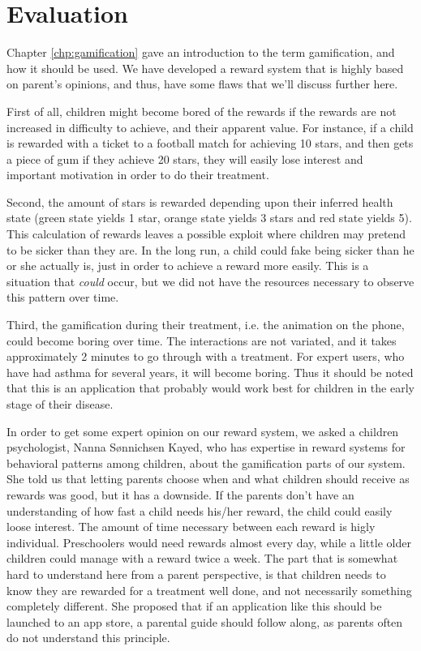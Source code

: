  
\section{Evaluation}
\label{sec:asthmappevaluation}
Chapter \ref{chp:gamification} gave an introduction to the term gamification, and how it should be used. We have developed a reward system that is highly based on parent's opinions, and thus, have some flaws that we'll discuss further here.

First of all, children might become bored of the rewards if the rewards are not increased in difficulty to achieve, and their apparent value. For instance, if a child is rewarded with a ticket to a football match for achieving 10 stars, and then gets a piece of gum if they achieve 20 stars, they will easily lose interest and important motivation in order to do their treatment. 

Second, the amount of stars is rewarded depending upon their inferred health state (green state yields 1 star, orange state yields 3 stars and red state yields 5). This calculation of rewards leaves a possible exploit where children may pretend to be sicker than they are. In the long run, a child could fake being sicker than he or she actually is, just in order to achieve a reward more easily. This is a situation that \emph{could} occur, but we did not have the resources necessary to observe this pattern over time.

Third, the gamification during their treatment, i.e. the animation on the phone, could become boring over time. 
The interactions are not variated, and it takes approximately 2 minutes to go through with a treatment. For expert users, who have had asthma for several years, it will become boring. Thus it should be noted that this is an application that probably would work best for children in the early stage of their disease.      

In order to get some expert opinion on our reward system, we asked a children psychologist, Nanna S\o nnichsen Kayed, who has expertise in reward systems for behavioral patterns among children, about the gamification parts of our system. 
She told us that letting parents choose when and what children should receive as rewards was good, but it has a downside. If the parents don't have an understanding of how fast a child needs his/her reward, the child could easily loose interest. The amount of time necessary between each reward is higly individual. Preschoolers would need rewards almost every day, while a little older children could manage with a reward twice a week. The part that is somewhat hard to understand here from a parent perspective, is that children needs to know they are rewarded for a treatment well done, and not necessarily something completely different. She proposed that if an application like this should be launched to an app store, a parental guide should follow along, as parents often do not understand this principle.

